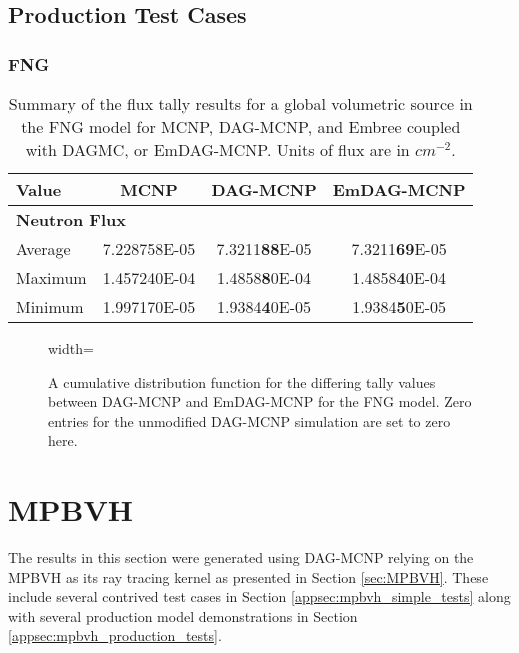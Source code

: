   \subsection{Production Test Cases}\label{appsec:emdag_fng}
  
  \subsubsection{FNG}

  \begin{table}[H]
    \small
    \begin{center}
      \begin{tabular}{lccc}
        \toprule
        Value & MCNP & DAG-MCNP & EmDAG-MCNP \\
        \hline
        \multicolumn{4}{l}{\textbf{Neutron Flux}} \\
        \hline
        Average & 7.228758E-05 & 7.3211\textbf{88}E-05 & 7.3211\textbf{69}E-05 \\
        Maximum & 1.457240E-04 & 1.4858\textbf{8}0E-04 & 1.4858\textbf{4}0E-04 \\
        Minimum & 1.997170E-05 & 1.9384\textbf{4}0E-05 & 1.9384\textbf{5}0E-05 \\
        \bottomrule
      \end{tabular}
    \end{center}
    \caption[Flux tally results in FNG for various DAG-MCNP
      implementations.]{Summary of the flux tally results for a global
      volumetric source in the FNG model for MCNP, DAG-MCNP, and Embree coupled
      with DAGMC, or EmDAG-MCNP. Units of flux are in $cm^{-2}$.}
  \end{table}

  \begin{figure}[H]
    \centering
    {width=\textwidth}
    \caption[Analysis of differing mesh tallies in FNG.]{A cumulative
      distribution function for the differing tally values between DAG-MCNP and
      EmDAG-MCNP for the FNG model. Zero entries for the unmodified DAG-MCNP
      simulation are set to zero here. }
  \end{figure}
  
  \section{MPBVH}

  The results in this section were generated using DAG-MCNP relying on the MPBVH
  as its ray tracing kernel as presented in Section \ref{sec:MPBVH}. These
  include several contrived test cases in Section
  \ref{appsec:mpbvh_simple_tests} along with several production model
  demonstrations in Section \ref{appsec:mpbvh_production_tests}.

